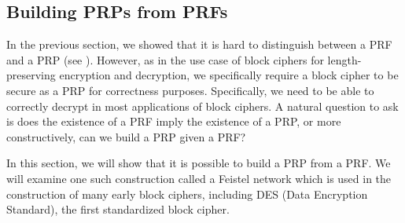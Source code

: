 \subsection{Building PRPs from PRFs}
In the previous section, we showed that it is hard to distinguish between a PRF and a PRP (see ).
However, as in the use case of block ciphers for length-preserving encryption and decryption, we specifically require a block cipher to be secure as a PRP for correctness purposes.
Specifically, we need to be able to correctly decrypt in most applications of block ciphers.
A natural question to ask is does the existence of a PRF imply the existence of a PRP, or more constructively, can we build a PRP given a PRF?

In this section, we will show that it is possible to build a PRP from a PRF.
We will examine one such construction called a Feistel network which is used in the construction of many early block ciphers, including DES (Data Encryption Standard), the first standardized block cipher.

